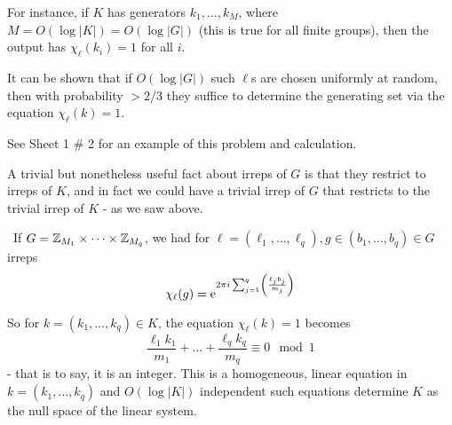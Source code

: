 \documentclass[]{article}
\begin{document}
\begin{itemize}
\begin{itemize}
	For instance, if $K$ has generators $k_1,\dots,k_M$, where $M = O(\log |K|) = O(\log |G|)$ (this is true for all finite groups), then the output has $\chi_{\ell}(k_i) = 1$ for all $i$.
	
	It can be shown that if $O(\log |G|)$ such $\ell$s are chosen uniformly at random, then with probability $> 2/3$ they suffice to determine the generating set via the equation $\chi_{\ell}(k) = 1$.
	
	See Sheet 1 \# 2 for an example of this problem and calculation.
	\end{itemize}
\end{itemize}

A trivial but nonetheless useful fact about irreps of $G$ is that they restrict to irreps of $K$, and in fact we could have a trivial irrep of $G$ that restricts to the trivial irrep of $K$ - as we saw above.

\begin{remark*}[Example]\
If $G = \mathbb{Z}_{M_1}\times\cdots\times \mathbb{Z}_{M_q}$, we had for $\ell = (\ell_1,\dots,\ell_q), g\in (b_1,\dots,b_q)\in G$ irreps $$\chi_{\ell}(g) = \mathrm{e}^{2\pi i\sum_{j=1}^{q}\left(\frac{\ell_j b_j}{m_j}\right)}$$

So for $k = (k_1,\dots,k_q)\in K$, the equation $\chi_{\ell}(k) = 1$ becomes
\[
\frac{\ell_1 k_1}{m_1} +\dots + \frac{\ell_q k_q}{m_q} \equiv 0\mod 1
\]
- that is to say, it is an integer. This is a homogeneous, linear equation in $k = (k_1,\dots,k_q)$ and $O(\log |K|)$ independent such equations determine $K$ as the null space of the linear system.
\end{remark*}
\end{document}
